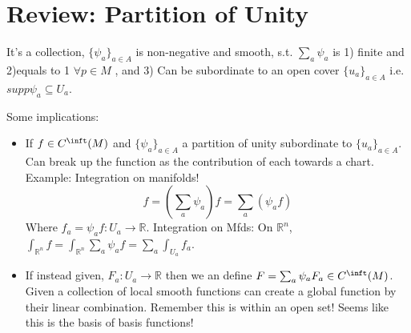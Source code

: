 \documentclass[12pt,letterpaper]{article}
\begin{document}
\section{Review: Partition of Unity}

It's a collection, $\{\psi_a\}_{a \in A}$ is non-negative and smooth, s.t. $\sum_a \psi_a$ is 1) finite and 2)equals to 1 $\forall p \in M$ , and 3) Can be subordinate to an open cover $\{u_a\}_{a \in A}$ i.e. $supp \psi_a \subseteq U_a$.

Some implications:
\begin{itemize}
    \item If $f \in C^{\inft}(M)$ and $\{ \psi_a \}_{a \in A} $ a partition of unity subordinate to $\{ u_a \}_{a \in A}$. Can break up the function as the contribution of each towards a chart. Example: Integration on manifolds!
\begin{equation}
    f = (\sum_a \psi_a) f = \sum_a (\psi_a f)
\end{equation}
Where $f_a = \psi_a f : U_a \rightarrow \mathbb{R}$. Integration on Mfds: On $\mathbb{R}^n$, $\int_{\mathbb{R}^n} f = \int_{\mathbb{R}^n} \sum_a \psi_a f = \sum_a \int_{U_a} f_a$. 
    \item If instead given, $F_a: U_a \rightarrow \mathbb{R}$ then we an define $F= \sum_a \psi_a F_a \in C^{\inft}(M)$. Given a collection of local smooth functions can create a global function by their linear combination. Remember this is within an open set! Seems like this is the basis of basis functions!
\end{itemize}
\end{document}
